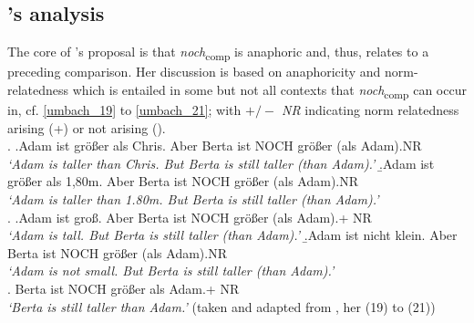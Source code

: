 \documentclass[output=paper,
modfonts
]{langscibook}
\begin{document}
\subsection{\citeauthor{umbach2009a_comp}'s \citeyearpar{umbach2009a_comp} analysis} \label{SubSec_umbach_analysis}

The core of \citeauthor{umbach2009a_comp}'s \citeyearpar{umbach2009a_comp} proposal is that \textit{noch}\textsubscript{comp} is anaphoric and, thus, relates to a preceding comparison. Her discussion is based on anaphoricity and norm-relatedness which is entailed in some but not all contexts that \textit{noch}\textsubscript{comp} can occur in, cf. \ref{umbach_19} to \ref{umbach_21}; with \textit{$+/-$ NR} indicating norm relatedness arising (+) or not arising (\textminus).\\


\ex.\label{umbach_19} \a.\small Adam ist größer als Chris. Aber Berta ist NOCH größer (als Adam).\hfill \textminus NR\\ \textit{`Adam is taller than Chris. But Berta is still taller (than Adam).'} \label{umbach_19a}
\b.\small Adam ist größer als 1,80m. Aber Berta ist NOCH größer (als Adam).\hfill \textminus NR\\ \textit{`Adam is taller than 1.80m. But Berta is still taller (than Adam).'} \label{umbach_19b}\\


\ex.\label{umbach_20} \a.\small Adam ist groß. Aber Berta ist NOCH größer (als Adam).\hfill + NR\\ \textit{`Adam is tall. But Berta is still taller (than Adam).'} \label{umbach_20a}
\b.\small Adam ist nicht klein. Aber Berta ist NOCH größer (als Adam).\hfill \textminus NR\\ \textit{`Adam is not small. But Berta is still taller (than Adam).'} \label{umbach_20b}\\


\ex.\small\label{umbach_21} Berta ist NOCH größer als Adam.\hfill + NR\\ \textit{`Berta is still taller than Adam.'} \flushright (taken and adapted from \citealt{umbach2009a_comp}, her (19) to (21))
\end{document}
